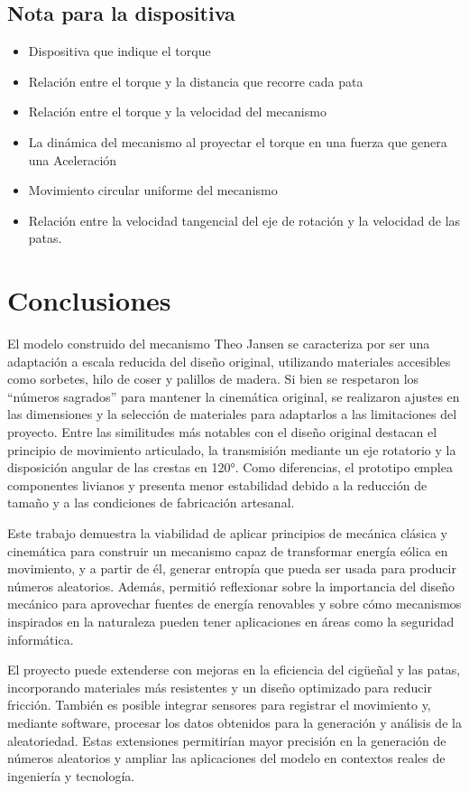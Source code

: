 \subsection{Nota para la dispositiva}
\begin{itemize}
  \item Dispositiva que indique el torque
  \item Relación entre el torque y la distancia que recorre cada pata
  \item Relación entre el torque y la velocidad del mecanismo
  \item La dinámica del mecanismo al proyectar el torque en una fuerza que genera una Aceleración
  \item Movimiento circular uniforme del mecanismo
  \item Relación entre la velocidad tangencial del eje de rotación y la velocidad de las patas.
\end{itemize}

\newpage

\section{Conclusiones}
El modelo construido del mecanismo Theo Jansen se caracteriza por ser una adaptación a escala reducida del diseño original, utilizando materiales accesibles como sorbetes, hilo de coser y palillos de madera. Si bien se respetaron los “números sagrados” para mantener la cinemática original, se realizaron ajustes en las dimensiones y la selección de materiales para adaptarlos a las limitaciones del proyecto. Entre las similitudes más notables con el diseño original destacan el principio de movimiento articulado, la transmisión mediante un eje rotatorio y la disposición angular de las crestas en 120°. Como diferencias, el prototipo emplea componentes livianos y presenta menor estabilidad debido a la reducción de tamaño y a las condiciones de fabricación artesanal.

Este trabajo demuestra la viabilidad de aplicar principios de mecánica clásica y cinemática para construir un mecanismo capaz de transformar energía eólica en movimiento, y a partir de él, generar entropía que pueda ser usada para producir números aleatorios. Además, permitió reflexionar sobre la importancia del diseño mecánico para aprovechar fuentes de energía renovables y sobre cómo mecanismos inspirados en la naturaleza pueden tener aplicaciones en áreas como la seguridad informática.

El proyecto puede extenderse con mejoras en la eficiencia del cigüeñal y las patas, incorporando materiales más resistentes y un diseño optimizado para reducir fricción. También es posible integrar sensores para registrar el movimiento y, mediante software, procesar los datos obtenidos para la generación y análisis de la aleatoriedad. Estas extensiones permitirían mayor precisión en la generación de números aleatorios y ampliar las aplicaciones del modelo en contextos reales de ingeniería y tecnología.